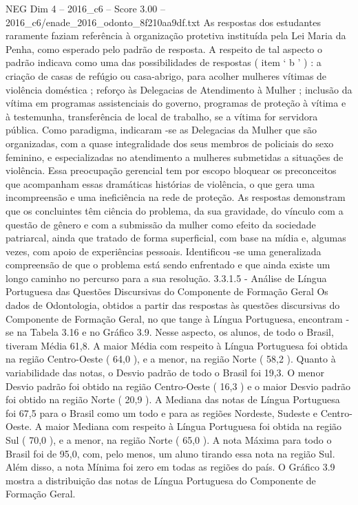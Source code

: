 \begin{textsample}{NEG Dim 4 – 2016\_c6 – Score 3.00 – 2016\_c6/enade\_2016\_odonto\_8f210aa9df.txt}
As respostas dos estudantes raramente faziam referência à organização protetiva instituída pela Lei Maria da Penha, como esperado pelo padrão de resposta.
A respeito de tal aspecto o padrão indicava como uma das possibilidades de respostas ( item ‘ b ’ ) : a criação de casas de refúgio ou casa-abrigo, para acolher mulheres vítimas de violência doméstica ; reforço às Delegacias de Atendimento à Mulher ; inclusão da vítima em programas assistenciais do governo, programas de proteção à vítima e à testemunha, transferência de local de trabalho, se a vítima for servidora pública.
Como paradigma, indicaram -se as Delegacias da Mulher que são organizadas, com a quase integralidade dos seus membros de policiais do sexo feminino, e especializadas no atendimento a mulheres submetidas a situações de violência.
Essa preocupação gerencial tem por escopo bloquear os preconceitos que acompanham essas dramáticas histórias de violência, o que gera uma incompreensão e uma ineficiência na rede de proteção.
As respostas demonstram que os concluintes têm ciência do problema, da sua gravidade, do vínculo com a questão de gênero e com a submissão da mulher como efeito da sociedade patriarcal, ainda que tratado de forma superficial, com base na mídia e, algumas vezes, com apoio de experiências pessoais.
Identificou -se uma generalizada compreensão de que o problema está sendo enfrentado e que ainda existe um longo caminho no percurso para a sua resolução. 3.3.1.5 - Análise de Língua Portuguesa das Questões Discursivas do Componente de Formação Geral Os dados de Odontologia, obtidos a partir das respostas às questões discursivas do Componente de Formação Geral, no que tange à Língua Portuguesa, encontram -se na Tabela 3.16 e no Gráfico 3.9.
Nesse aspecto, os alunos, de todo o Brasil, tiveram Média 61,8.
A maior Média com respeito à Língua Portuguesa foi obtida na região Centro-Oeste ( 64,0 ), e a menor, na região Norte ( 58,2 ).
Quanto à variabilidade das notas, o Desvio padrão de todo o Brasil foi 19,3.
O menor Desvio padrão foi obtido na região Centro-Oeste ( 16,3 ) e o maior Desvio padrão foi obtido na região Norte ( 20,9 ).
A Mediana das notas de Língua Portuguesa foi 67,5 para o Brasil como um todo e para as regiões Nordeste, Sudeste e Centro-Oeste.
A maior Mediana com respeito à Língua Portuguesa foi obtida na região Sul ( 70,0 ), e a menor, na região Norte ( 65,0 ).
A nota Máxima para todo o Brasil foi de 95,0, com, pelo menos, um aluno tirando essa nota na região Sul.
Além disso, a nota Mínima foi zero em todas as regiões do país.
O Gráfico 3.9 mostra a distribuição das notas de Língua Portuguesa do Componente de Formação Geral.

\end{textsample}
